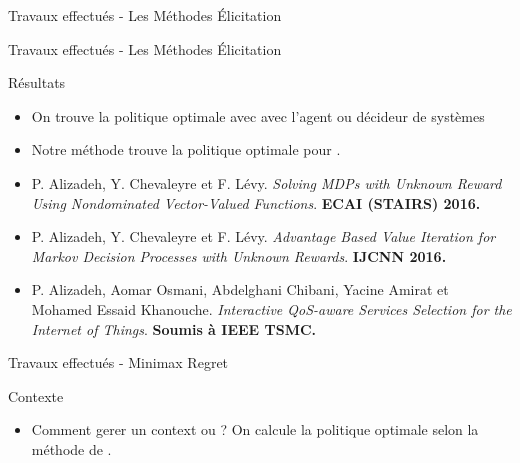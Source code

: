 \documentclass{beamer}
\newcommand{\imp}[1]{{\color{red}{#1}}}
\begin{document}
{{\begin{frame}{Travaux effectués - Les Méthodes Élicitation}
\end{frame}







\begin{frame}{Travaux effectués - Les Méthodes Élicitation}

\begin{block}{Résultats}
\begin{itemize}
\item On trouve la politique optimale avec \imp{$65 \% $  moins de communications }avec l’agent ou décideur de
systèmes
\item Notre méthode trouve la politique optimale  pour \imp{instances réeles de grande taille}.
\end{itemize}
\end{block}

\begin{itemize}
\small
\item P. Alizadeh, Y. Chevaleyre et F. Lévy. \textit{Solving MDPs with Unknown Reward Using Nondominated Vector-Valued Functions}. \textbf{ECAI (STAIRS) 2016.}
\item P. Alizadeh, Y. Chevaleyre et F. Lévy. \textit{Advantage Based Value Iteration for Markov Decision Processes with Unknown Rewards}. \textbf{IJCNN 2016.}
\item P. Alizadeh, Aomar Osmani, Abdelghani Chibani, Yacine Amirat et Mohamed Essaid Khanouche. \textit{Interactive QoS-aware Services Selection for the Internet of Things}. \textbf{Soumis à IEEE TSMC.}
\end{itemize}


\end{frame}



\begin{frame}{Travaux effectués - Minimax Regret }

\begin{block}{Contexte}
\begin{itemize}
\item Comment gerer un context ou \imp{les récompenses sont incertaines}? On calcule la politique optimale selon la méthode de \imp{minimax regret}.
\end{itemize}
\end{block}



\end{frame}}}
\end{document}
